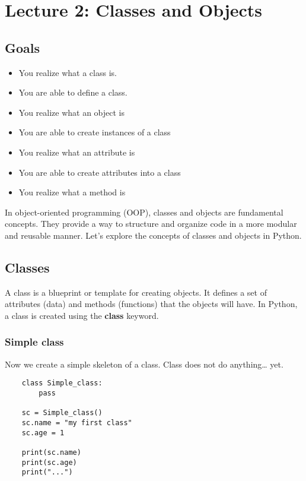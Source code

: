\documentclass{article}
\begin{document}
\section{Lecture 2: Classes and Objects}
\subsection{Goals}
\begin{itemize}
    \item You realize what a class is.
    \item You are able to define a class.
    \item You realize what an object is
    \item You are able to create instances of a class
    \item You realize what an attribute is
    \item You are able to create attributes into a class
    \item You realize what a method is
\end{itemize}
In object-oriented programming (OOP), classes and objects are fundamental concepts. They provide a way to structure and organize code in a more modular and reusable manner. Let's explore the concepts of classes and objects in Python.

\subsection{Classes}
A class is a blueprint or template for creating objects. It defines a set of attributes (data) and methods (functions) that the objects will have.
In Python, a class is created using the \textbf{class} keyword.

\subsubsection{Simple class}
Now we create a simple skeleton of a class. Class does not do anything… yet.

\begin{verbatim}
    class Simple_class:
        pass
    
    sc = Simple_class()
    sc.name = "my first class"
    sc.age = 1

    print(sc.name)
    print(sc.age)
    print("...")
\end{verbatim}
\end{document}
